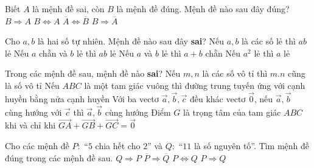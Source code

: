 \begin{ex}%
	Biết $A$ là mệnh đề sai, còn $B$ là mệnh đề đúng. Mệnh đề nào sau đây đúng?
	\choice 
	{ $B\Rightarrow A$}
	{ $B\Leftrightarrow A$ }
	{ $\overline{A}\Leftrightarrow \overline{B}$ }
	{ \True $B\Rightarrow \overline{A}$} 
\end{ex} 

\begin{ex}%
	Cho $a,b$ là hai số tự  nhiên. Mệnh đề nào sau đây \textbf{sai}?
	\choice
	{Nếu $a, b$ là các số lẻ thì $ab$ lẻ}
	{\True Nếu $a$ chẵn và $b$ lẻ thì $ab$ lẻ}
	{Nếu $a$ và $b$ lẻ thì $a+b$ chẵn}
	{Nếu $a^2$ lẻ thì $a$ lẻ} 
\end{ex}

\begin{ex}%
	Trong các mệnh đề sau, mệnh đề nào \textbf{sai}?
	\choice
	{\True Nếu $m,n$ là các số vô tỉ thì $m.n$ cũng là số vô tỉ}
	{Nếu $ABC$ là một tam giác vuông thì đường trung tuyến ứng với cạnh huyền bằng nửa cạnh huyền}
	{Với ba vectơ $\vec{a},\vec{b},\vec{c}$ đều khác vectơ $\vec{0}$, nếu $\vec{a},\vec{b}$ cùng hướng với $\vec{c}$ thì $\vec{a},\vec{b}$ cùng hướng}
	{Điểm $G$ là trọng tâm của tam giác $ABC$ khi và chỉ khi $\vec{GA}+\vec{GB}+\vec{GC}=\vec{0}$}
\end{ex}

\begin{ex}%
	Cho các mệnh đề $ P:$ “$5$ chia hết cho $2$” và $Q:$ “$11$ là số nguyên tố”. Tìm mệnh đề đúng trong các mệnh đề sau.
	\choice
	{$Q \Rightarrow P$}
	{$\overline{P} \Rightarrow \overline{Q}$}
	{$P \Leftrightarrow Q$}
	{\True $P \Rightarrow Q$}
\end{ex}

